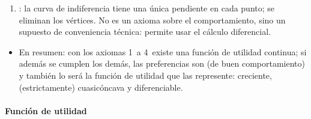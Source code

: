\documentclass[11pt]{article}
\begin{document}
\begin{enumerate}
  : si $\vect{x}^1\sim \vect{x}^0$ y $\vect{x}^1\neq \vect{x}^0$, entonces $\tau \vect{x}^1+(1-\tau)\vect{x}^0\succ \vect{x}^0$ para todo $\tau\in(0,1)$. Elimina los tramos rectos y garantiza que la demanda sea única.\footnote{Con convexidad estricta descartamos los \emph{sustitutivos perfectos} (curvas de indiferencia rectas) y los \emph{complementarios perfectos} (curvas en forma de L), cuyas preferencias son solo débilmente convexas.}
\item {}: la curva de indiferencia tiene una única pendiente en cada punto; se eliminan los vértices. No es un axioma sobre el comportamiento, sino un supuesto de conveniencia técnica: permite usar el cálculo diferencial.
\end{enumerate}

\begin{itemize}
\item En resumen: con los axiomas 1~a 4~existe una función de utilidad continua; si además se cumplen los demás, las preferencias son  (de buen comportamiento) y también lo será la función de utilidad que las represente: creciente, (estrictamente) cuasicóncava y diferenciable.
\end{itemize}

\paragraph{Función de utilidad}
\end{document}

